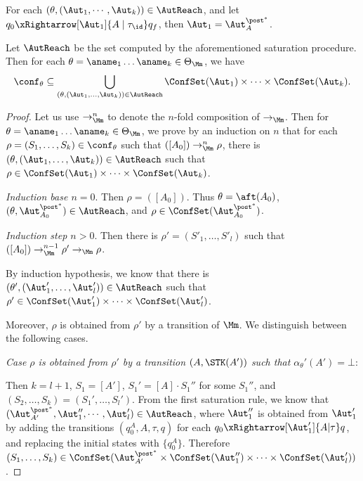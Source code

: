\begin{proposition}\label{prop:sat0}
    For each $(\theta,(\Aut_1,\cdots,\Aut_k))\in\AutReach$, and let $q_0\xRightarrow[\Aut_1]{A\mid\tau_{\id}}q_f$, then $\Aut_1 = \Aut_{A}^{\post^*}$.
\end{proposition}

\smallskip
\begin{lemma}\label{lem:a0nostk}
    Let $\AutReach$ be the set computed by the aforementioned saturation procedure. Then for each $\theta=\aname_1\dots\aname_k\in\Theta_{\Mm}$, we have
    $$\conf_{\theta}\subseteq\bigcup \limits_{(\theta, (\Aut_1, \dots, \Aut_k)) \in \AutReach} \ConfSet(\Aut_1) \times \dots \times \ConfSet(\Aut_k).$$
\end{lemma}

\begin{proof}
Let us use $\rightarrow_{\Mm}^n$ to denote the $n$-fold composition of $\rightarrow_\Mm$. Then for $\theta = \aname_1 \dots \aname_k \in \Theta_\Mm$, we prove by an induction on $n$ that for each $\rho = (S_1, \dots, S_k) \in \conf_\theta$ such that  $([A_0]) \rightarrow^n_\Mm \rho$, there is  $(\theta, (\Aut_1, \dots, \Aut_k)) \in \AutReach$ such that $\rho \in  \ConfSet(\Aut_1) \times \dots \times \ConfSet(\Aut_k)$.

\noindent \emph{Induction base $n = 0$}. Then $\rho = ([A_0])$. Thus $\theta = \aft(A_0)$, $(\theta, \Aut_{A_0}^{\post^*}) \in \AutReach$, and $\rho \in \ConfSet(\Aut_{A_0}^{\post^*})$.

\smallskip

\noindent \emph{Induction step $n > 0$}. Then there is $\rho' = (S'_1, \dots, S'_l)$ such that $([A_0]) \rightarrow^{n-1}_\Mm \rho' \rightarrow_\Mm \rho$.

By induction hypothesis, we know that there is $(\theta', (\Aut'_1, \dots, \Aut'_l)) \in \AutReach$ such that $ \rho' \in \ConfSet(\Aut'_1) \times \dots \times \ConfSet(\Aut'_l)$.

Moreover, $\rho$ is obtained from $\rho'$  by a transition of $\Mm$. We distinguish between the following cases.

\smallskip
\noindent \emph{Case $\rho$ is obtained from $\rho'$ by a transition $(A,\STK(A'))$ such that $\alpha_\theta'(A')=\bot$}: 

Then $k=l+1$, $S_1=[A']$, $S_1'=[A]\cdot S_1''$ for some $S_1''$, and $(S_2,\dots,S_k)=(S_1',\dots,S_l')$.
From the first saturation rule, we know that $(\Aut_{A'}^{\post^*},\Aut_1'',\cdots,\Aut_l')\in\AutReach$, where $\Aut_1''$ is obtained from $\Aut_1'$ by adding the transitions $(q_0^{A},A,\tau,q)$ for each $q_0\xRightarrow[\Aut_1']{A | \tau} q$, and replacing the initial states with $\{q_0^{A}\}$.
Therefore $(S_1,\dots,S_k)\in\ConfSet(\Aut_{A'}^{\post^*}\times\ConfSet(\Aut_1'')\times\cdots\times\ConfSet(\Aut_l'))$.


\end{proof}
